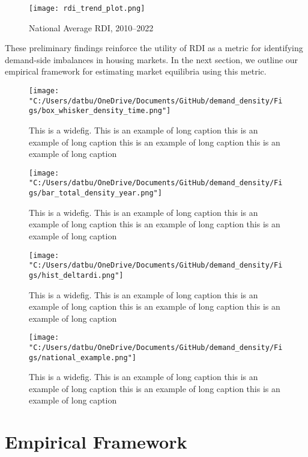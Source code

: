 \documentclass[sn-mathphys-num]{sn-jnl}%
\theoremstyle{thmstyleone}%
\theoremstyle{thmstyletwo}%
\theoremstyle{thmstylethree}%
\begin{document}
\begin{figure}[H]
	\centering
	\texttt{[image: rdi\_trend\_plot.png]} %
	\caption{National Average RDI, 2010--2022}
	\label{fig:rdi_trend}
\end{figure}

These preliminary findings reinforce the utility of RDI as a metric for identifying demand-side imbalances in housing markets. In the next section, we outline our empirical framework for estimating market equilibria using this metric.


\begin{figure}[H]
	\centering
	\texttt{[image: "C:/Users/datbu/OneDrive/Documents/GitHub/demand\_density/Figs/box\_whisker\_density\_time.png"]}
	\caption{This is a widefig. This is an example of long caption this is an example of long caption  this is an example of long caption this is an example of long caption}\label{fig1}
\end{figure}

\begin{figure}[H]
	\centering
	\texttt{[image: "C:/Users/datbu/OneDrive/Documents/GitHub/demand\_density/Figs/bar\_total\_density\_year.png"]}
	\caption{This is a widefig. This is an example of long caption this is an example of long caption  this is an example of long caption this is an example of long caption}\label{fig2}
\end{figure}

\begin{figure}[H]
	\centering
	\texttt{[image: "C:/Users/datbu/OneDrive/Documents/GitHub/demand\_density/Figs/hist\_deltardi.png"]}
	\caption{This is a widefig. This is an example of long caption this is an example of long caption  this is an example of long caption this is an example of long caption}\label{fig3}
\end{figure}

\begin{figure}[H]
	\centering
	\texttt{[image: "C:/Users/datbu/OneDrive/Documents/GitHub/demand\_density/Figs/national\_example.png"]}
	\caption{This is a widefig. This is an example of long caption this is an example of long caption  this is an example of long caption this is an example of long caption}\label{fig4}
\end{figure}


\section{Empirical Framework}
\end{document}
